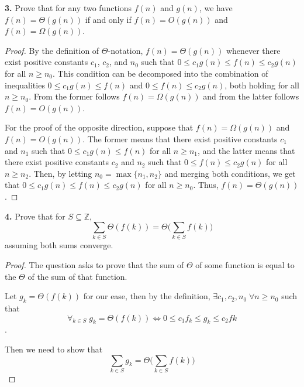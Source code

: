 \documentclass[addpoints]{exam}
\begin{document}
\begin{questions}
  \question
  \textbf{3. } Prove that for any two functions $ f(n) $ and $ g(n) $, we have $ f(n) = \Theta(g(n)) $ if and only if $ f(n) = O(g(n)) $ and $ f(n) = \Omega(g(n)) $.
  \begin{solution}
    \begin{proof} \vspace*{-4mm}
      By the definition of $\Theta$-notation, $f(n)= \Theta(g(n))$ whenever there exist positive constants $c_1$, $c_2$, and $n_0$ such that  $ 0 \leq c_1g(n) \leq f(n) \leq c_2g(n)$ for all $n \geq n_0$. This condition can be decomposed into the combination of inequalities $0\le c_1g(n) \leq f(n)$ and $0 \leq f(n) \leq c_2g(n)$, both holding for all $n \geq n_0$. From the former follows $f(n) = \Omega(g(n))$ and from the latter follows $f(n) = O(g(n))$.

      For the proof of the opposite direction, suppose that $f(n) = \Omega(g(n))$ and $f(n) = O(g(n))$.
      The former means that there exist positive constants $c_1$ and $n_1$ such that $0 \leq c_1g(n) \leq f(n)$ for all $n \geq n_1$, and the latter means that there exist positive constants $c_2$ and $n_2$ such that $0 \leq f(n) \leq c_2g(n)$ for all $n \geq n_2$.
      Then, by letting $n_0 = \max\{n_1,n_2\}$ and merging both conditions, we get that $ 0 \leq c_1g(n) \leq f(n) \leq c_2g(n) $ for all $n \geq n_0$. Thus, $ f(n) = \Theta(g(n))$.
    \end{proof}
  \end{solution}

  \question
  \textbf{4. } Prove that for $ S \subseteq \mathbb{Z} $, $$ \sum_{k \in S} \Theta(f(k)) = \Theta \biggl(  \sum_{k \in S} f(k) \biggr) $$ assuming both sums converge.
  \begin{solution}
    \begin{proof} \vspace*{-4mm}
      The question asks to prove that the sum of $ \Theta $ of some function is equal to the $ \Theta $ of the sum of that function.

      Let $ g_k = \Theta(f(k)) $ for our ease, then by the definition, $ \exists c_1, c_2, n_0 \; \forall n \geq n_0 $ such that $$ \forall_{k \in S} \; g_k = \Theta(f(k)) \iff 0 \leq c_1 f_k \leq g_k \leq c_2fk $$.

      Then we need to show that $$ \sum_{k \in S} g_k = \Theta \biggl( \sum_{k \in S} f(k) \biggr) $$


\end{proof}
\end{solution}
\end{questions}
\end{document}
